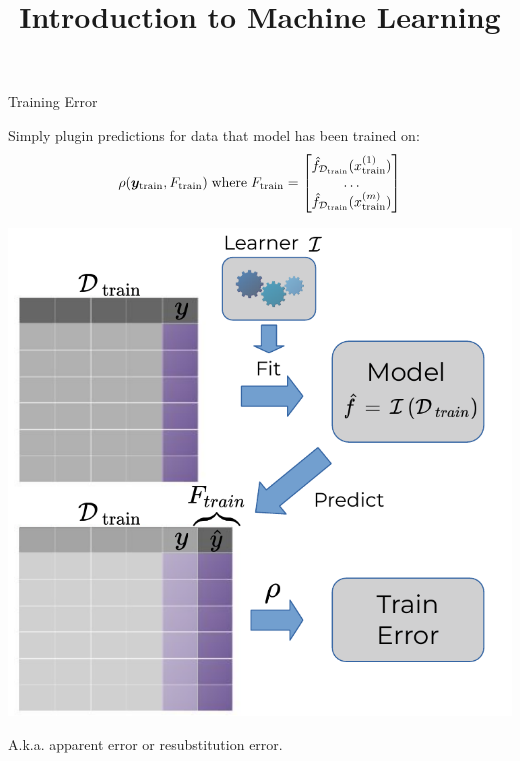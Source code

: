 




\newcommand{\titlefigure}{figure/eval_train_2}
\newcommand{\learninggoals}{
\item Understand the definition of training error
\item Understand why train error is unreliable for models of higher complexity
  when overfitting can occur}


\title{Introduction to Machine Learning}
\date{}



\sloppy


\begin{vbframe}{Training Error}


Simply plugin predictions for data that model has been trained on:
\small
$$\rho(\yv_{\mathrm{train}}, F_{\textrm{train}})\;\text{where}\; 
F_{\textrm{train}} = \begin{bmatrix} 
\fhDtrain(\xi[1]_{\textrm{train}}) \\ 
\dots \\
\fhDtrain(\xi[m]_{\textrm{train}})
\end{bmatrix}$$ 

\begin{center}
\includegraphics[width=.40\textwidth]{figure_man/train_error.pdf}
\end{center}

A.k.a. apparent error or resubstitution error.

\end{vbframe}


